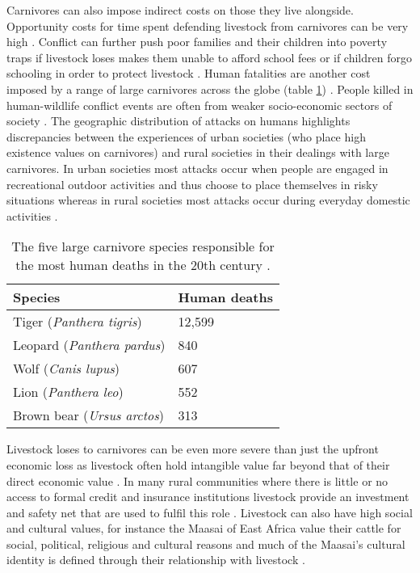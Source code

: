 Carnivores can also impose indirect costs on those they live alongside. Opportunity costs for time spent defending livestock from carnivores can be very high \cite{woodroffe2005people}. Conflict can further push poor families and their children into poverty traps if livestock loses makes them unable to afford school fees or if children forgo schooling in order to protect livestock \cite{Dickman2011}. Human fatalities are another cost imposed by a range of large carnivores across the globe (table \ref{table:Deaths}) \cite{Loe2004a}. People killed in human-wildlife conflict events are often from weaker socio-economic sectors of society \cite{Das2011}. The geographic distribution of attacks on humans highlights discrepancies between the experiences of urban societies (who place high existence values on carnivores) and rural societies in their dealings with large carnivores. In urban societies most attacks occur when people are engaged in recreational outdoor activities and thus choose to place themselves in risky situations whereas in rural societies most attacks occur during everyday domestic activities \cite{Loe2004a}.\\

\begin{table}[h]
	\small
	\begin{center}
		\begin{tabular}{l l}
			\hline \hline		
			Species 				& Human deaths\\ \hline
			Tiger (\textit{Panthera tigris})				& 12,599\\
			Leopard 	(\textit{Panthera pardus})			& 840\\
			Wolf	 (\textit{Canis lupus})			 		& 607\\
			Lion	 (\textit{Panthera leo})					& 552\\
			Brown bear (\textit{Ursus arctos}) 			& 313\\
			\hline \hline						
		\end{tabular}
		\caption{The five large carnivore species responsible for the most human deaths in the 20th century \cite{Loe2004a}.}
	\label{table:Deaths}
	\end{center}
\end{table}

Livestock loses to carnivores can be even more severe than just the upfront economic loss as livestock often hold intangible value far beyond that of their direct economic value \cite{Kansky2014e}. In many rural communities where there is little or no access to formal credit and insurance institutions livestock provide an investment and safety net that are used to fulfil this role \cite{Kurosaki1995,Andrew2003}. Livestock can also have high social and cultural values, for instance the Maasai of East Africa value their cattle for social, political, religious and cultural reasons and much of the Maasai's cultural identity is defined through their relationship with livestock \cite{Galaty2016a}.\\

